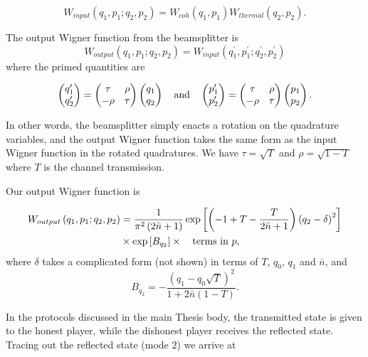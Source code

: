 \begin{equation}
W_{input}\left(q_1, p_1 ; q_2, p_2\right) = W_{coh}\left(q_1, p_1\right) W_{thermal}\left(q_2, p_2\right).
\end{equation}

\noindent The output Wigner function from the beamsplitter is \cite{Leonhardt2010}
\begin{equation}
W_{output}\left(q_1, p_1 ; q_2, p_2\right) = W_{input}\left(q_1^\prime, p_1^\prime ; q_2^\prime, p_2^\prime \right)
\end{equation}
where the primed quantities are

\begin{equation}
\pmqty{q_1^\prime \\ q_2^\prime} = \pmqty{\tau & \rho \\ - \rho & \tau} \pmqty{q_1 \\ q_2} \qq{and} \pmqty{p_1^\prime \\ p_2^\prime} = \pmqty{\tau & \rho \\ - \rho & \tau} \pmqty{p_1 \\ p_2}.
\end{equation}

\noindent In other words, the beamsplitter simply enacts a rotation on the quadrature variables, and the output Wigner function takes the same form as the input Wigner function in the rotated quadratures. We have $\tau = \sqrt{T}$ and $\rho = \sqrt{1-T}$ where $T$ is the channel transmission.

Our output Wigner function is

\begin{align}
W_{output}\left(q_1, p_1; q_2, p_2\right) &= \frac{1}{\pi^2 \left(2 \bar{n}+1\right)} \exp\left[ \left(-1 + T  - \frac{T}{2 \bar{n} 
+1}\right) \left(q_2 - \delta\right)^2 \right]   \notag \\
%
&\times \exp\left[B_{q_2} \right] \times \qq{terms in $p$,}
\end{align}
where $\delta$ takes a complicated form (not shown) in terms of $T$, $q_0$, $q_1$ and $\bar{n}$, and 
\begin{equation}
B_{q_2} = -\frac{\left(q_1 - q_0 \sqrt{T}\right)^2}{1 + 2 \bar{n} \left(1-T\right)}.
\end{equation}

\noindent In the protocols discussed in the main Thesis body, the transmitted state is given to the honest player, while the dishonest player receives the reflected state. Tracing out the reflected state (mode $2$) we arrive at

